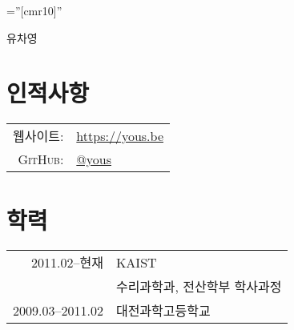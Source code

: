 \documentclass[a4paper,10pt]{article}
\begin{document}

\pagestyle{empty} %

\font\fb=''[cmr10]'' %

\par{\centering
{\Huge 유차영
}\bigskip\par}

\section{인적사항}

\begin{tabular}{rl}
  \textsc{웹사이트:}  & \url{https://yous.be} \\
  \textsc{GitHub:}    & \href{https://github.com/yous}{@yous} \\
\end{tabular}

\section{학력}
\begin{tabular}{rl}
  2011.02--현재 & KAIST \\
  & \textsc{수리과학과}, \textsc{전산학부} 학사과정 \\
  2009.03--2011.02 & 대전과학고등학교
\end{tabular}

\end{document}
